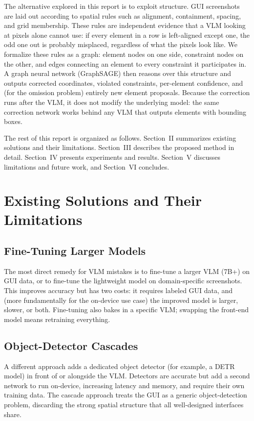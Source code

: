 \documentclass[11pt, letterpaper]{article}
\begin{document}
The alternative explored in this report is to exploit structure. GUI
screenshots are laid out according to spatial rules such as alignment,
containment, spacing, and grid membership. These rules are independent
evidence that a VLM looking at pixels alone cannot use: if every element in
a row is left-aligned except one, the odd one out is probably misplaced,
regardless of what the pixels look like. We formalize these rules as a graph:
element nodes on one side, constraint nodes on the other, and edges connecting
an element to every constraint it participates in. A graph neural network
(GraphSAGE) then reasons over this structure and outputs corrected
coordinates, violated constraints, per-element confidence, and (for the
omission problem) entirely new element proposals. Because the correction
runs after the VLM, it does not modify the underlying model: the same
correction network works behind any VLM that outputs elements with bounding
boxes.

The rest of this report is organized as follows. Section~II summarizes
existing solutions and their limitations. Section~III describes the proposed
method in detail. Section~IV presents experiments and results. Section~V
discusses limitations and future work, and Section~VI concludes.

\section{Existing Solutions and Their Limitations}
\subsection{Fine-Tuning Larger Models}
The most direct remedy for VLM mistakes is to fine-tune a larger VLM (7B+) on
GUI data, or to fine-tune the lightweight model on domain-specific screenshots.
This improves accuracy but has two costs: it requires labeled GUI data, and
(more fundamentally for the on-device use case) the improved model is
larger, slower, or both. Fine-tuning also bakes in a specific VLM; swapping
the front-end model means retraining everything.

\subsection{Object-Detector Cascades}
A different approach adds a dedicated object detector (for example, a DETR
\cite{carion2020detr} model) in front of or alongside the VLM. Detectors are
accurate but add a second network to run on-device, increasing latency and
memory, and require their own training data. The cascade approach treats the
GUI as a generic object-detection problem, discarding the strong spatial
structure that all well-designed interfaces share.
\end{document}
